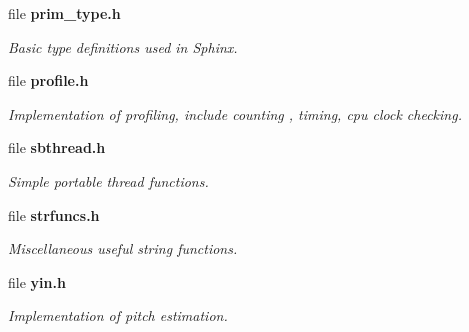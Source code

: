 \begin{DoxyCompactItemize}
file \textbf{ prim\+\_\+type.\+h}
\begin{DoxyCompactList}\small\item\em Basic type definitions used in Sphinx. \end{DoxyCompactList}\item 
file \textbf{ profile.\+h}
\begin{DoxyCompactList}\small\item\em Implementation of profiling, include counting , timing, cpu clock checking. \end{DoxyCompactList}\item 
file \textbf{ sbthread.\+h}
\begin{DoxyCompactList}\small\item\em Simple portable thread functions. \end{DoxyCompactList}\item 
file \textbf{ strfuncs.\+h}
\begin{DoxyCompactList}\small\item\em Miscellaneous useful string functions. \end{DoxyCompactList}\item 
file \textbf{ yin.\+h}
\begin{DoxyCompactList}\small\item\em Implementation of pitch estimation. \end{DoxyCompactList}\end{DoxyCompactItemize}
